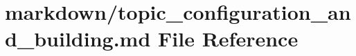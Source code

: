\hypertarget{topic__configuration__and__building_8md}{}\section{markdown/topic\+\_\+configuration\+\_\+and\+\_\+building.md File Reference}
\label{topic__configuration__and__building_8md}
